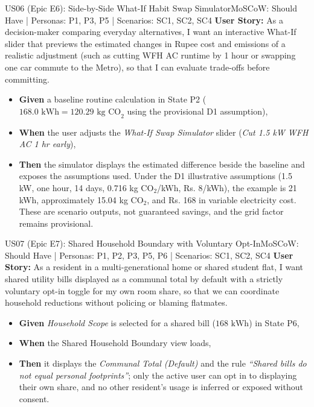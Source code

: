 \documentclass[12pt,a4paper]{article}
\begin{document}
\begin{storybox}{US06 (Epic E6): Side-by-Side What-If Habit Swap Simulator}{MoSCoW: Should Have | Personas: P1, P3, P5 | Scenarios: SC1, SC2, SC4}
\textbf{User Story:} As a decision-maker comparing everyday alternatives, I want an interactive What-If slider that previews the estimated changes in Rupee cost and emissions of a realistic adjustment (such as cutting WFH AC runtime by 1 hour or swapping one car commute to the Metro), so that I can evaluate trade-offs before committing.
\begin{itemize}
    \item \textbf{Given} a baseline routine calculation in State P2 ($168.0\text{ kWh} = 120.29\text{ kg CO}_2$ using the provisional D1 assumption),
    \item \textbf{When} the user adjusts the \textit{What-If Swap Simulator} slider (\textit{Cut 1.5 kW WFH AC 1 hr early}),
    \item \textbf{Then} the simulator displays the estimated difference beside the baseline and exposes the assumptions used. Under the D1 illustrative assumptions (1.5 kW, one hour, 14 days, 0.716 kg CO$_2$/kWh, Rs. 8/kWh), the example is 21 kWh, approximately 15.04 kg CO$_2$, and Rs. 168 in variable electricity cost. These are scenario outputs, not guaranteed savings, and the grid factor remains provisional.
\end{itemize}
\end{storybox}

\begin{storybox}{US07 (Epic E7): Shared Household Boundary with Voluntary Opt-In}{MoSCoW: Should Have | Personas: P1, P2, P3, P5, P6 | Scenarios: SC1, SC2, SC4}
\textbf{User Story:} As a resident in a multi-generational home or shared student flat, I want shared utility bills displayed as a communal total by default with a strictly voluntary opt-in toggle for my own room share, so that we can coordinate household reductions without policing or blaming flatmates.
\begin{itemize}
    \item \textbf{Given} \textit{Household Scope} is selected for a shared bill ($168\text{ kWh}$) in State P6,
    \item \textbf{When} the Shared Household Boundary view loads,
    \item \textbf{Then} it displays the \textit{Communal Total (Default)} and the rule \textit{``Shared bills do not equal personal footprints''}; only the active user can opt in to displaying their own share, and no other resident's usage is inferred or exposed without consent.
\end{itemize}
\end{storybox}
\end{document}
